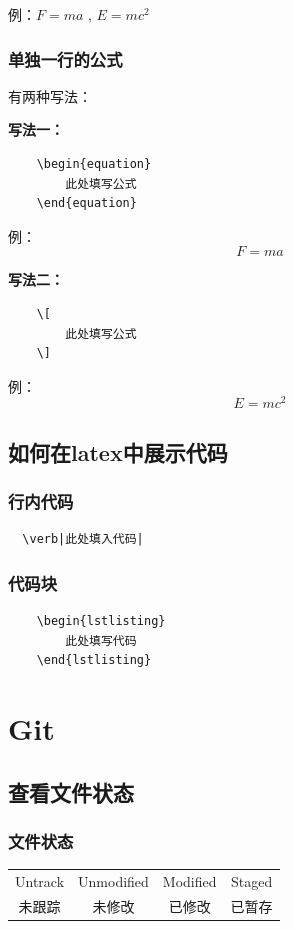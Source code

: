 \documentclass[UTF8]{ctexart}
\begin{document}
例：$F=ma$ , $E=mc^2$
\subsubsection{单独一行的公式}
有两种写法：

\textbf{写法一：}
\begin{lstlisting}
    \begin{equation}
        此处填写公式
    \end{equation}
\end{lstlisting}
\qquad 例：
\begin{equation}
    F=ma
\end{equation}

\textbf{写法二：}
\begin{lstlisting}
    \[
        此处填写公式
    \]
\end{lstlisting}
\qquad 例：
\[
    E=mc^2
\]

\subsection{如何在latex中展示代码} 
\subsubsection{行内代码} 
\begin{lstlisting}
  \verb|此处填入代码|
\end{lstlisting}

\subsubsection{代码块} 
\begin{Verbatim}
    \begin{lstlisting}
        此处填写代码
    \end{lstlisting}
\end{Verbatim}


\newpage
\section{Git}
\subsection{查看文件状态}
\subsubsection{文件状态}
\begin{table}[H]
    \centering
    \begin{tabular}{|c|c|c|c|}
        \hline
        Untrack & Unmodified & Modified & Staged\\
        未跟踪 & 未修改 & 已修改 & 已暂存\\
        \hline
    \end{tabular}
\end{table}
\end{document}
